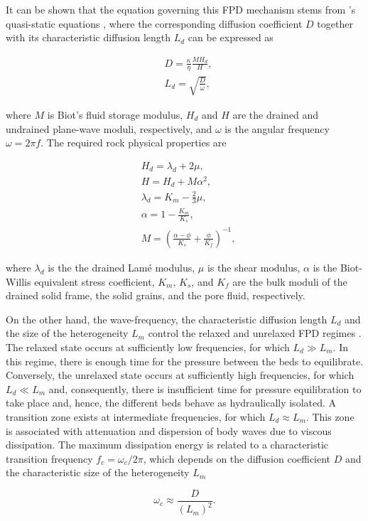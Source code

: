 \documentclass[draft]{agujournal2019}
\begin{document}
It can be shown that the equation governing this FPD mechanism stems from \citeauthor{Biot1941}'s \citeyear{Biot1941} quasi-static equations \cite{Dutta1979, Chandler1981, Norris1993}, where the corresponding diffusion coefficient $D$ together with its characteristic diffusion length $L_d$ can be expressed as \cite{Norris1993}
\begin{linenomath*}
\begin{equation}\label{Eq.3}
\begin{split}
&D= \frac {\kappa} {\eta} \frac{M H_d}{H},\\
&L_d=\sqrt{\frac{D}{\omega}},
\end{split}
\end{equation}
\end{linenomath*}
where $M$ is Biot’s fluid storage modulus, $H_d$ and $H$ are the drained and undrained plane-wave moduli, respectively, and $\omega$ is the angular frequency $\omega = 2 \pi f$.
The required rock physical properties are
\begin{linenomath*}
\begin{equation}\label{Eq.4}
\begin{split}
& H_d = \lambda_d + 2 \mu, \\
& H = H_d + M \alpha ^2, \\
& \lambda_d= K_m - \frac{2}{3} \mu, \\
& \alpha =1-\frac{K_m}{K_s},\\
& M  =\left( \frac{\alpha-\phi}{K_s} +\frac{\phi}{K_f} \right)^{-1},
\end{split}
\end{equation}
\end{linenomath*}
where $\lambda_d$ is the the drained Lamé modulus, $\mu$ is the shear modulus, $\alpha$ is the Biot-Willis equivalent stress coefficient, $K_m$, $K_s$, and $K_f$ are the bulk moduli of the drained solid frame, the solid grains, and the pore fluid, respectively.

On the other hand, the wave-frequency, the characteristic diffusion length $L_d$  and the size of the heterogeneity $L_m$ control the relaxed and unrelaxed FPD regimes \cite{Muller2010}. The relaxed state occurs at sufficiently low frequencies, for which  $L_d \gg L_m$. In this regime, there is enough time for the pressure between the beds to equilibrate. Conversely, the unrelaxed state occurs at sufficiently high frequencies, for which $L_d \ll L_m$ and, consequently, there is insufficient time for pressure equilibration to take place and, hence, the different beds behave as hydraulically isolated. A transition zone exists at intermediate frequencies, for which $L_d \approx L_m$.
This zone is associated with attenuation and dispersion of body waves due to viscous dissipation. The maximum dissipation energy is related to a characteristic transition frequency $f_c= \omega_c/2\pi$, which depends on the diffusion coefficient $D$ and the characteristic size of the heterogeneity $L_m$ \cite{Muller2006}
\begin{linenomath*}
\begin{equation}\label{Eq.5}
\omega_c \approx \frac{D}{(L_m)^2}.
\end{equation}
\end{linenomath*}
\end{document}
